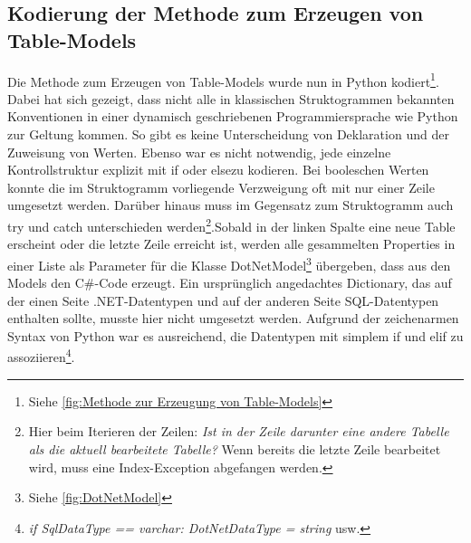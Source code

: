 \documentclass[11pt,toc=sectionentrywithoutdots, 
headheight=44pt, headings=optiontoheadandtoc, hyperfootnotes=false, hypertexnames=false]{scrartcl}
\newcommand\extendedref[1]{Siehe \ref{#1}}
\begin{document}
\subsection{Kodierung der Methode zum Erzeugen von Table-Models}
Die Methode zum Erzeugen von Table-Models wurde nun in Python kodiert\footnote{\extendedref{fig:Methode zur Erzeugung von Table-Models}}. Dabei hat sich gezeigt, dass nicht alle in klassischen Struktogrammen bekannten Konventionen in einer \gls{dynamisch} geschriebenen Programmiersprache wie Python zur Geltung kommen. So gibt es keine Unterscheidung von Deklaration und der Zuweisung von Werten. Ebenso war es nicht notwendig, jede einzelne Kontrollstruktur explizit mit \glqq if\grqq{} oder \glqq else\grqq zu kodieren. Bei booleschen Werten konnte die im Struktogramm vorliegende Verzweigung oft mit nur einer Zeile umgesetzt werden. Darüber hinaus muss im Gegensatz zum Struktogramm auch \glqq try \grqq{} und \glqq catch \grqq{} unterschieden werden\footnote{Hier beim Iterieren der Zeilen: \textit{Ist in der Zeile darunter eine andere Tabelle als die aktuell bearbeitete Tabelle?} Wenn bereits die letzte Zeile bearbeitet wird, muss eine Index-Exception abgefangen werden.}.\newline Sobald in der linken Spalte eine neue Table erscheint oder die letzte Zeile erreicht ist, werden alle gesammelten Properties in einer Liste als Parameter für die Klasse \glqq DotNetModel\footnote{\extendedref{fig:DotNetModel}}\grqq{} übergeben, dass aus den Models den C\#-Code erzeugt. Ein ursprünglich angedachtes \gls{Dictionary}, das auf der einen Seite .NET-Datentypen und auf der anderen Seite SQL-Datentypen enthalten sollte, musste hier nicht umgesetzt werden. Aufgrund der zeichenarmen Syntax von Python war es ausreichend, die Datentypen mit simplem \glqq if \grqq{} und \glqq elif \grqq{} zu assoziieren\footnote{\textit{if SqlDataType == \grq varchar\grq{}: DotNetDataType = \grq string\grq{}} usw.}. 
\end{document}
